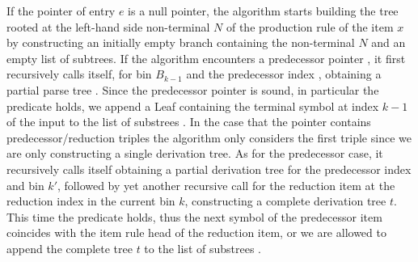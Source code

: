 \begin{isabellebody}
\begin{isamarkuptext}
If the pointer of entry $e$ is a null pointer, the algorithm starts building the tree rooted at
the left-hand side non-terminal $N$ of the production rule of the item $x$ by constructing an initially
empty branch containing the non-terminal $N$ and an empty list of subtrees. If the algorithm encounters
a predecessor pointer , it first recursively calls itself, for bin $B_{k-1}$ and the
predecessor index , obtaining a partial parse tree . Since the predecessor pointer is sound,
in particular the  predicate holds, we append a Leaf containing the terminal symbol at index
$k-1$ of the input \isa{{\isasymomega}} to the list of substrees . In the case that
the pointer contains predecessor/reduction triples the algorithm only considers the first triple
 since we are only constructing a single derivation tree. As for the predecessor
case, it recursively calls itself obtaining a partial derivation tree  for the predecessor index 
and bin $k'$, followed by yet another recursive call for the reduction item at the reduction index 
in the current bin $k$, constructing a complete derivation tree $t$. This time the 
predicate holds, thus the next symbol of the predecessor item coincides with the item rule head of
the reduction item, or we are allowed to append the complete tree $t$ to the list of substrees .


\end{isamarkuptext}
\end{isabellebody}
